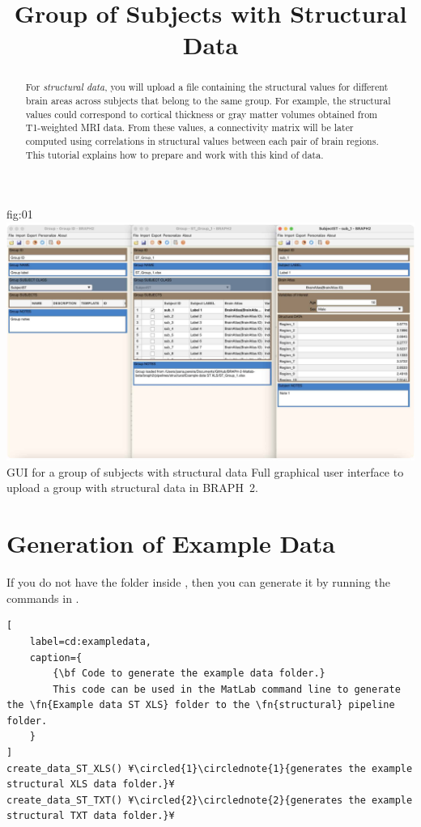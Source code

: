 \documentclass[justified]{tufte-handout}
\title{Group of Subjects with Structural Data}
\begin{document}
\maketitle

\begin{abstract}
\noindent
For \emph{structural data}, you will upload a file containing the structural values for different brain areas across subjects that belong to the same group. For example, the structural values could correspond to cortical thickness or gray matter volumes obtained from T1-weighted MRI data. From these values, a connectivity matrix will be later computed using correlations in structural values between each pair of brain regions. This tutorial explains how to prepare and work with this kind of data.
\end{abstract}


\tableofcontents

	{fig:01}
	{\includegraphics{fig01.jpg}}
	{GUI for a group of subjects with structural data}
	{
	Full graphical user interface to upload a group with structural data in BRAPH~2. 
	}

\clearpage
\section{Generation of Example Data}

If you do not have the  folder inside , then you can generate it by running the commands in .

\begin{lstlisting}[
	label=cd:exampledata,
	caption={
		{\bf Code to generate the example data folder.}
		This code can be used in the MatLab command line to generate the \fn{Example data ST XLS} folder to the \fn{structural} pipeline folder.
	}
]
create_data_ST_XLS() ¥\circled{1}\circlednote{1}{generates the example structural XLS data folder.}¥
create_data_ST_TXT() ¥\circled{2}\circlednote{2}{generates the example structural TXT data folder.}¥
\end{lstlisting}
\end{document}

